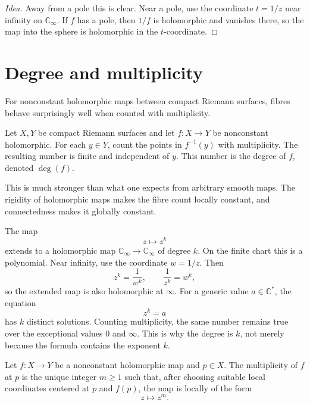 \begin{proof}[Idea]
Away from a pole this is clear.  Near a pole, use the coordinate \(t=1/z\) near infinity on \(\mathbb C_\infty\).  If \(f\) has a pole, then \(1/f\) is holomorphic and vanishes there, so the map into the sphere is holomorphic in the \(t\)-coordinate.
\end{proof}

\section{Degree and multiplicity}

For nonconstant holomorphic maps between compact Riemann surfaces, fibres behave surprisingly well when counted with multiplicity.

\begin{proposition}
Let \(X,Y\) be compact Riemann surfaces and let \(f:X\to Y\) be nonconstant holomorphic.  For each \(y\in Y\), count the points in \(f^{-1}(y)\) with multiplicity.  The resulting number is finite and independent of \(y\).  This number is the degree of \(f\), denoted \(\deg(f)\).
\end{proposition}

\begin{remark}
This is much stronger than what one expects from arbitrary smooth maps.  The rigidity of holomorphic maps makes the fibre count locally constant, and connectedness makes it globally constant.
\end{remark}

\begin{example}
The map
\[
  z\mapsto z^k
\]
extends to a holomorphic map \(\mathbb C_\infty\to\mathbb C_\infty\) of degree \(k\).  On the finite chart this is a polynomial.  Near infinity, use the coordinate \(w=1/z\).  Then
\[
  z^k=\frac1{w^k},
  \qquad
  \frac1{z^k}=w^k,
\]
so the extended map is also holomorphic at \(\infty\).  For a generic value \(a\in\mathbb C^*\), the equation
\[
  z^k=a
\]
has \(k\) distinct solutions.  Counting multiplicity, the same number remains true over the exceptional values \(0\) and \(\infty\).  This is why the degree is \(k\), not merely because the formula contains the exponent \(k\).
\end{example}

\begin{definition}
Let \(f:X\to Y\) be a nonconstant holomorphic map and \(p\in X\).  The multiplicity of \(f\) at \(p\) is the unique integer \(m\ge1\) such that, after choosing suitable local coordinates centered at \(p\) and \(f(p)\), the map is locally of the form
\[
  z\mapsto z^m.
\]
\end{definition}

